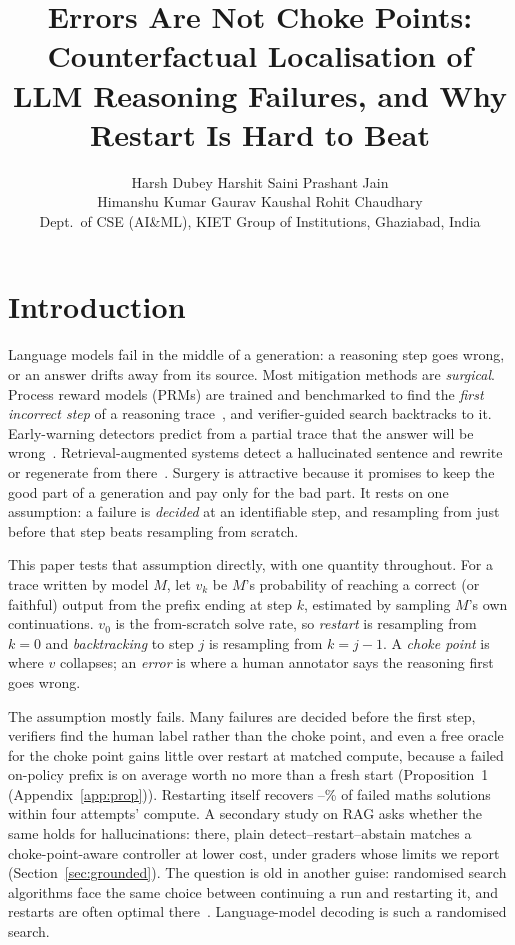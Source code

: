 \documentclass[10pt,twocolumn]{article}
\title{\Large\bfseries Errors Are Not Choke Points: Counterfactual Localisation of\\LLM Reasoning Failures, and Why Restart Is Hard to Beat}
\author{Harsh Dubey \quad Harshit Saini \quad Prashant Jain\\ Himanshu Kumar \quad Gaurav Kaushal \quad Rohit Chaudhary\\
\small Dept.\ of CSE (AI\&ML), KIET Group of Institutions, Ghaziabad, India}
\date{}
\begin{document}
\maketitle



\section{Introduction}
Language models fail in the middle of a generation: a reasoning step goes wrong, or an answer
drifts away from its source. Most mitigation methods are \emph{surgical}. Process reward models
(PRMs) are trained and benchmarked to find the \emph{first incorrect step} of a reasoning
trace~\cite{lightman2023,uesato2022,processbench}, and verifier-guided search backtracks to it.
Early-warning detectors predict from a partial trace that the answer will be
wrong~\cite{afzal2025,lugoloobi2026}. Retrieval-augmented systems detect a hallucinated sentence and
rewrite or regenerate from there~\cite{gao2023rarr,dhuliawala2024cove}. Surgery is attractive
because it promises to keep the good part of a generation and pay only for the bad part. It rests
on one assumption: a failure is \emph{decided} at an identifiable step, and resampling from just
before that step beats resampling from scratch.

This paper tests that assumption directly, with one quantity throughout. For a trace written by model $M$, let
$v_k$ be $M$'s probability of reaching a correct (or faithful) output from the prefix ending at step
$k$, estimated by sampling $M$'s own continuations. $v_0$ is the from-scratch solve rate, so
\emph{restart} is resampling from $k=0$ and \emph{backtracking} to step $j$ is resampling from
$k=j-1$. A \emph{choke point} is where $v$ collapses; an \emph{error} is where a human annotator says
the reasoning first goes wrong.

The assumption mostly fails. Many failures are decided before the first step, verifiers find the
human label rather than the choke point, and even a free oracle for the choke point gains little
over restart at matched compute, because a failed on-policy prefix is on average worth no more than a
fresh start (Proposition~1 (Appendix~\ref{app:prop})). Restarting itself recovers
\recMinFour--\recMaxFour\% of failed maths solutions within four attempts' compute. A secondary
study on RAG asks whether the same holds for hallucinations: there, plain detect--restart--abstain
matches a choke-point-aware controller at lower cost, under graders whose limits we report
(Section~\ref{sec:grounded}). The question is
old in another guise: randomised search algorithms face the same choice between continuing a run and
restarting it, and restarts are often optimal there~\cite{luby1993,gomes2000}. Language-model decoding
is such a randomised search.
\end{document}
